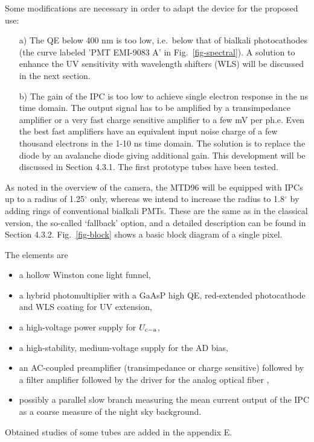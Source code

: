Some
modifications are necessary in order to adapt the device for the proposed
use:

\begin{itemize}
\item[a)]  The QE below 400 nm is too low, i.e.\ below that of bialkali
photocathodes (the curve labeled 'PMT EMI-9083 A'
in Fig.~\ref{fig-spectral}). A solution to enhance the UV sensitivity with wavelength
shifters (WLS) will be discussed in the next section.

\item[b)]  The gain of the IPC is too low to achieve single electron
response in the ns time domain. The output signal has to be amplified by a
transimpedance amplifier or a very fast charge sensitive amplifier to a few
mV per ph.e. Even the best fast amplifiers have an equivalent input noise
charge of a few thousand electrons in the 1-10 ns time domain. The solution
is to replace the diode by an avalanche diode giving additional gain. This
development will be discussed in Section 4.3.1. The first prototype tubes
have been tested.
\end{itemize}

As noted in the overview of the camera, the MTD96 will be equipped with IPCs
up to a radius of 1.25$^{\circ }$ only, whereas we intend to increase the
radius to 1.8$^{\circ }$ by adding rings of conventional bialkali PMTs. These
are the same as in the classical version, the so-called `fallback' option,
and a detailed description can be found in Section 4.3.2. Fig.~\ref{fig-block}
shows a basic block diagram of a single pixel.

The elements are
\begin{itemize}
\item  a hollow Winston cone light funnel,

\item  a hybrid photomultiplier with a GaAsP high QE, red-extended
photocathode and WLS coating for UV extension,

\item  a high-voltage power supply for $U_{\mathrm{c{\rm -a}}}$,

\item  a high-stability, medium-voltage supply for the AD bias,

\item  an AC-coupled preamplifier (transimpedance or charge sensitive)
followed by a filter amplifier followed by the driver for the analog optical
fiber ,

\item  possibly a parallel slow branch measuring the mean current output of
the IPC as a coarse measure of the night sky background.
\end{itemize}
Obtained studies of some tubes are added in the appendix E.

